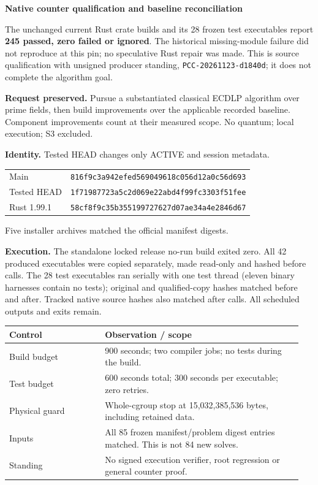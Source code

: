 \documentclass[10pt]{article}
\begin{document}
{\Large\bfseries Native counter qualification and baseline reconciliation}

The unchanged current Rust crate builds and its 28 frozen test executables
report \textbf{245 passed, zero failed or ignored}. The historical missing-module
failure did not reproduce at this pin; no speculative Rust repair was made.
This is source qualification with unsigned producer standing,
\texttt{PCC-20261123-d1840d}; it does not complete the algorithm goal.

\textbf{Request preserved.} Pursue a substantiated classical ECDLP algorithm
over prime fields, then build improvements over the applicable recorded
baseline. Component improvements count at their measured scope. No quantum;
local execution; S3 excluded.

\textbf{Identity.} Tested HEAD changes only ACTIVE and session metadata.

\begin{tabular}{@{}ll@{}}
Main & \texttt{816f9c3a942efed569049618c056d12a0c56d693}\\
Tested HEAD & \texttt{1f71987723a5c2d069e22abd4f99fc3303f51fee}\\
Rust 1.99.1 & \texttt{58cf8f9c35b355199727627d07ae34a4e2846d67}
\end{tabular}

Five installer archives matched the official manifest digests.

\textbf{Execution.} The standalone locked release no-run build exited zero.
All 42 produced executables were copied separately, made read-only and hashed
before calls. The 28 test executables ran serially with one test thread
(eleven binary harnesses contain no tests);
original and qualified-copy hashes matched before and after. Tracked native
source hashes also matched after calls. All scheduled outputs and exits remain.

\begin{tabular}{@{}p{0.31\linewidth}p{0.64\linewidth}@{}}\toprule
Control & Observation / scope \\\midrule
Build budget & 900 seconds; two compiler jobs; no tests during the build.\\
Test budget & 600 seconds total; 300 seconds per executable; zero retries.\\
Physical guard & Whole-cgroup stop at 15,032,385,536 bytes, including retained data.\\
Inputs & All 85 frozen manifest/problem digest entries matched. This is not 84 new solves.\\
Standing & No signed execution verifier, root regression or general counter proof.\\\bottomrule
\end{tabular}
\end{document}
